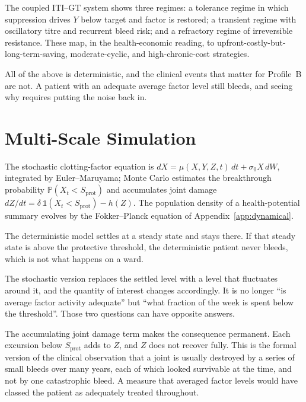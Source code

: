 \begin{remark}
The coupled ITI--GT system shows three regimes: a tolerance regime in which
suppression drives $Y$ below target and factor is restored; a transient regime
with oscillatory titre and recurrent bleed risk; and a refractory regime of
irreversible resistance. These map, in the health-economic reading, to
upfront-costly-but-long-term-saving, moderate-cyclic, and high-chronic-cost
strategies.
\end{remark}

All of the above is deterministic, and the clinical events that matter for Profile~B
are not. A patient with an adequate average factor level still bleeds, and
seeing why requires putting the noise back in.

\section{Multi-Scale Simulation}
\label{sec:C_simulation}
The stochastic clotting-factor equation is $dX=\mu(X,Y,Z,t)\,dt+\sigma_0 X\,dW$,
integrated by Euler--Maruyama; Monte Carlo estimates the breakthrough probability
$\mathbb{P}(X_t<S_{\text{prot}})$ and accumulates joint damage
$dZ/dt=\delta\,\mathbb{1}(X_t<S_{\text{prot}})-h(Z)$. The population density of a
health-potential summary evolves by the Fokker--Planck equation of
Appendix~\ref{app:dynamical}.

\begin{reading}
The deterministic model settles at a steady state and stays there. If that
steady state is above the protective threshold, the deterministic patient never
bleeds, which is not what happens on a ward.

The stochastic version replaces the settled level with a level that fluctuates
around it, and the quantity of interest changes accordingly. It is no longer
``is average factor activity adequate'' but ``what fraction of the week is
spent below the threshold''. Those two questions can have opposite answers.

The accumulating joint damage term makes the consequence permanent. Each
excursion below $S_{\text{prot}}$ adds to $Z$, and $Z$ does not recover fully.
This is the formal version of the clinical observation that a joint is
usually destroyed by a series of small bleeds over many years, each of which
looked survivable at the time, and not by one catastrophic bleed. A measure
that averaged factor levels would have classed the patient as adequately
treated throughout.
\end{reading}

